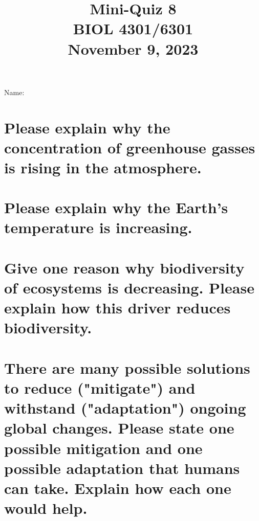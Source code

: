 \documentclass[12pt, notitlepage]{article}   	%
\title{
	\textbf{
		Mini-Quiz 8
	} \\
	\large BIOL 4301/6301 \\
	\large November 9, 2023 \\
}
\date{\vspace{-5ex}}
\def\wl{\par \vspace{\baselineskip}}
\begin{document}
{\selectfont %

\large{Name:}

{\let\newpage\relax\maketitle}

\section{\small{Please explain why the concentration of greenhouse gasses is
rising in the atmosphere.}}

\wl
\wl
\wl
\wl
\wl
\wl
\wl
\wl
\wl

\section{\small{Please explain why the Earth's temperature is increasing.}}

\newpage

\section{\small{Give one reason why biodiversity of ecosystems is decreasing. Please
explain how this driver reduces biodiversity.}}

\wl
\wl
\wl
\wl
\wl
\wl
\wl
\wl
\wl

\section{\small{There are many possible solutions to reduce ("mitigate") and withstand ("adaptation")
ongoing global changes. Please state one possible mitigation and one possible adaptation that humans
can take. Explain how each one would help.}}


} %
\end{document}
